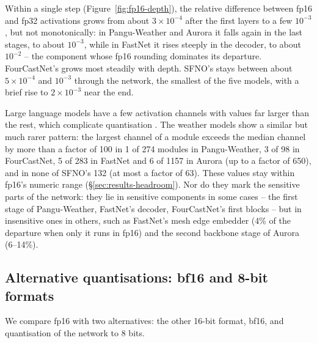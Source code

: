 Within a single step (Figure~\ref{fig:fp16-depth}), the
relative difference between fp16 and fp32 activations grows from about
$3\times10^{-4}$ after the first layers to a few $10^{-3}$, but not
monotonically: in Pangu-Weather and Aurora it falls again in the last stages, to about $10^{-3}$, while in FastNet it rises steeply in the decoder, to about
$10^{-2}$ -- the component whose fp16 rounding dominates its departure.
FourCastNet's grows most steadily with depth. SFNO's stays between about
$5\times10^{-4}$ and $10^{-3}$ through the network, the smallest of the
five models, with a brief rise to $2\times10^{-3}$ near the end.

Large language models have a few activation channels with
values far larger than the rest, which complicate quantisation
\citep{dettmers2022llmint8}. The weather models show a similar but much
rarer pattern: the largest channel of a module exceeds the median channel
by more than a factor of 100 in 1 of 274 modules in Pangu-Weather, 3 of 98 in FourCastNet, 5 of 283 in FastNet and 6 of 1157 in Aurora (up to a factor of 650), and in none of SFNO's 132 (at most a factor of 63). These
values stay within fp16's numeric range (\S\ref{sec:results-headroom}). Nor do
they mark the sensitive parts of the network: they lie in sensitive
components in some cases -- the first stage of Pangu-Weather, FastNet's
decoder, FourCastNet's first blocks -- but in insensitive ones in others,
such as FastNet's mesh edge embedder (4\% of the departure when only it
runs in fp16) and
the second backbone stage of Aurora (6--14\%).

\subsection{Alternative quantisations: bf16 and 8-bit formats}
\label{sec:results-bf16}
\label{sec:results-alternatives}

We compare fp16 with two alternatives: the other 16-bit format, bf16, and
quantisation of the network to 8 bits.


